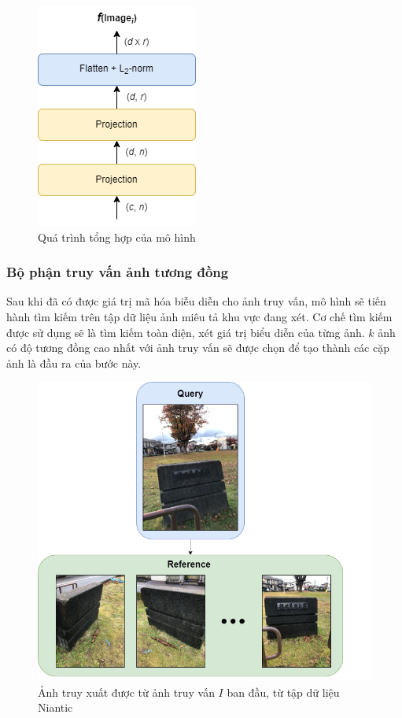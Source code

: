 \begin{figure}[H]
  \centering
  \includegraphics[scale=0.8]{pics/Proposal/proj-agg.png}
  \caption{Quá trình tổng hợp của mô hình \cite{alibey2023mixvpr}}
\end{figure}

\subsubsection{Bộ phận truy vấn ảnh tương đồng}

Sau khi đã có được giá trị mã hóa biễu diễn cho ảnh truy vấn, mô hình sẽ tiến hành tìm kiếm trên tập dữ liệu ảnh miêu tả khu vực đang xét. Cơ chế tìm kiếm được sử dụng sẽ là tìm kiếm toàn diện, xét giá trị biểu diễn của từng ảnh. $k$ ảnh có độ tương đồng cao nhất với ảnh truy vấn sẽ được chọn để tạo thành các cặp ảnh là đầu ra của bước này.

\begin{figure}[H]
  \centering
  \includegraphics[scale=0.5]{pics/Proposal/query.png}
  \caption[Kết quả của module VPR]{Ảnh truy xuất được từ ảnh truy vấn $I$ ban đầu, từ tập dữ liệu Niantic \cite{arnold2022mapfree}}
\end{figure}

